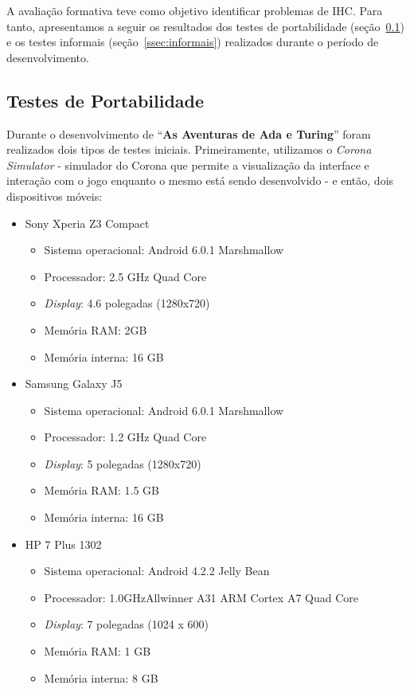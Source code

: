 A avaliação formativa teve como objetivo identificar problemas de \acrshort{IHC}. Para tanto, apresentamos a seguir os resultados dos testes de portabilidade (seção~\ref{ssec:testes_portabilidade}) e os testes informais (seção~\ref{ssec:informais}) realizados durante o período de desenvolvimento.

\subsection{Testes de Portabilidade} \label{ssec:testes_portabilidade}

Durante o desenvolvimento de “\textbf{As Aventuras de Ada e Turing}” foram realizados dois tipos de testes iniciais. Primeiramente, utilizamos o \textit{Corona Simulator} - simulador do Corona que permite a visualização da interface e interação com o jogo enquanto o mesmo está sendo desenvolvido - e então, dois dispositivos móveis:

\begin{itemize}
	\item Sony Xperia Z3 Compact
	\begin{itemize}
		\item Sistema operacional: Android 6.0.1 Marshmallow
		\item Processador: 2.5 GHz Quad Core
		\item \textit{Display}: 4.6 polegadas (1280x720)
		\item Memória RAM: 2GB
		\item Memória interna: 16 GB
\end{itemize}
\end{itemize}

\begin{itemize}
	\item Samsung Galaxy J5
	\begin{itemize}
		\item Sistema operacional: Android 6.0.1 Marshmallow
		\item Processador: 1.2 GHz Quad Core
		\item \textit{Display}: 5 polegadas (1280x720)
		\item Memória RAM: 1.5 GB
		\item Memória interna: 16 GB
\end{itemize}
\end{itemize}

\begin{itemize}
	\item HP 7 Plus 1302
	\begin{itemize}
		\item Sistema operacional: Android 4.2.2 Jelly Bean
		\item Processador: 1.0GHzAllwinner A31 ARM Cortex A7 Quad Core
		\item \textit{Display}: 7 polegadas (1024 x 600)
		\item Memória RAM: 1 GB
		\item Memória interna: 8 GB
\end{itemize}
\end{itemize}

